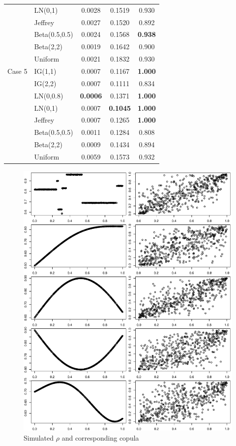 \documentclass{amsart}
\begin{document}
\begin{table}[ht]
\begin{tabular}{l|l|ccc}
  & LN(0,1) & 0.0028 & 0.1519 & 0.930 \\ 
  & Jeffrey & 0.0027 & 0.1520 & 0.892 \\ 
  & Beta(0.5,0.5) & 0.0024 & 0.1568 & \textbf{0.938} \\ 
  & Beta(2,2) & 0.0019 & 0.1642 & 0.900 \\ 
  & Uniform & 0.0021 & 0.1832 & 0.930 \\ 
   \midrule
Case 5 & IG(1,1) & 0.0007 & 0.1167 & \textbf{1.000} \\ 
  & IG(2,2) & 0.0007 & 0.1111 & 0.834 \\ 
  & LN(0,0.8) & \textbf{0.0006} & 0.1371 & \textbf{1.000} \\ 
  & LN(0,1) & 0.0007 & \textbf{0.1045} & \textbf{1.000} \\ 
  & Jeffrey & 0.0007 & 0.1265 & \textbf{1.000} \\ 
  & Beta(0.5,0.5) & 0.0011 & 0.1284 & 0.808 \\ 
  & Beta(2,2) & 0.0009 & 0.1434 & 0.894 \\ 
  & Uniform & 0.0059 & 0.1573 & 0.932 \\ 
   \bottomrule
\end{tabular}
\end{table}

\begin{figure}[ht]
    \centering
    \includegraphics[width=0.95\linewidth]{true_rho_copula.pdf}
    \caption{Simulated $\rho$ and corresponding copula}
    \label{fig:sim-dat}
\end{figure}
\end{document}
